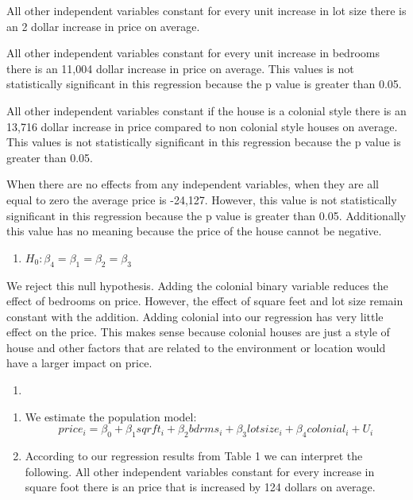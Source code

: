 \documentclass[
  12pt,
  landscape]{article}
\providecommand{\tightlist}{%
  \setlength{\itemsep}{0pt}\setlength{\parskip}{0pt}}
\begin{document}
All other independent variables constant for every unit increase in lot
size there is an 2 dollar increase in price on average.

All other independent variables constant for every unit increase in
bedrooms there is an 11,004 dollar increase in price on average. This
values is not statistically significant in this regression because the p
value is greater than 0.05.

All other independent variables constant if the house is a colonial
style there is an 13,716 dollar increase in price compared to non
colonial style houses on average. This values is not statistically
significant in this regression because the p value is greater than 0.05.

When there are no effects from any independent variables, when they are
all equal to zero the average price is -24,127. However, this value is
not statistically significant in this regression because the p value is
greater than 0.05. Additionally this value has no meaning because the
price of the house cannot be negative.

\begin{enumerate}
\def\labelenumi{\roman{enumi})}
\setcounter{enumi}{2}
\tightlist
\item
  \({H_0: \beta_4 = \beta_1 =\beta_2 = \beta_3 }\)
\end{enumerate}

We reject this null hypothesis. Adding the colonial binary variable
reduces the effect of bedrooms on price. However, the effect of square
feet and lot size remain constant with the addition. Adding colonial
into our regression has very little effect on the price. This makes
sense because colonial houses are just a style of house and other
factors that are related to the environment or location would have a
larger impact on price.

\begin{enumerate}
\def\labelenumi{(\alph{enumi})}
\setcounter{enumi}{4}
\item
\end{enumerate}

\begin{enumerate}
\def\labelenumi{\roman{enumi})}
\tightlist
\item
  We estimate the population model: \[
  price_i = \beta_0 + \beta_1sqrft_i + \beta_2bdrms_i + \beta_3lotsize_i + \beta_4colonial_i + U_i
  \]
\item
  According to our regression results from Table 1 we can interpret the
  following. All other independent variables constant for every increase
  in square foot there is an price that is increased by 124 dollars on
  average.
\end{enumerate}
\end{document}
